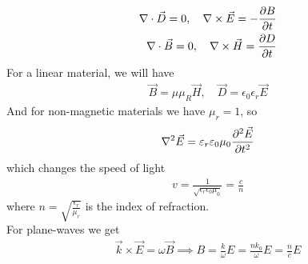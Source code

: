 \begin{align*}
\nabla \cdot \vec{D} = 0, \quad \nabla \times \vec{E} = - \frac{\partial B}{\partial t}\\
\nabla \cdot \vec{B} = 0, \quad \nabla \times \vec{H} = \frac{\partial D}{\partial t}
\end{align*}
For a linear material, we will have
\begin{align*}
\vec{B} = \mu\mu_R \vec{H}, \quad \vec{D} = \epsilon_0\epsilon_r \vec{E}
\end{align*}
And for non-magnetic materials we have $\mu_r = 1$, so 
\begin{align*}
\nabla^2 \vec{E} = \varepsilon_r\varepsilon_0\mu_0 \frac{\partial^2 \vec{E}}{\partial t^2}
\end{align*}
which changes the speed of light
\begin{align*}
				v = \frac{1}{\sqrt{\epsilon_r\epsilon_0\mu_0}} = \frac{c}{n} 
\end{align*}
where $n = \sqrt{\frac{\epsilon_r}{\mu_r}}$ is the index of refraction.\\

For plane-waves we get
\begin{align*}
\vec{k} \times \vec{E} = \omega \vec{B} \implies B = \frac{k}{\omega}E = \frac{nk_0}{\omega}E = \frac{n}{c}E
\end{align*}
